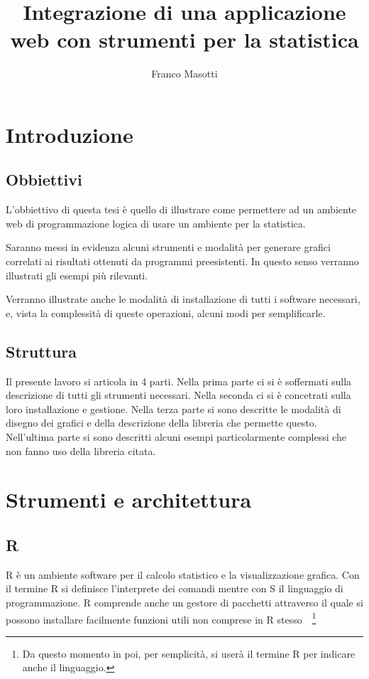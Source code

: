 \documentclass[10pt,titlepage,twoside,a4paper]{report}
\title{Integrazione di una applicazione web con strumenti per la statistica}
\author{Franco Masotti}
\begin{document}

\maketitle
\newpage
\tableofcontents
\newpage
\listoffigures
\newpage
\listoflistings
\cleardoublepage





\chapter{Introduzione}
\label{ch:introduzione}
    \section{Obbiettivi}
L'obbiettivo di questa tesi è quello di illustrare come 
permettere ad un ambiente web di programmazione logica di usare un ambiente per 
la statistica.

Saranno messi in evidenza alcuni strumenti e modalità per generare grafici 
correlati ai risultati ottenuti da programmi preesistenti. In questo senso 
verranno illustrati gli esempi più rilevanti.

Verranno illustrate anche le modalità di installazione di tutti i software
necessari, e, vista la complessità di queste operazioni, alcuni modi per 
semplificarle.

    \section{Struttura}
Il presente lavoro si articola in 4 parti. Nella prima parte ci si è 
soffermati sulla descrizione di tutti gli strumenti necessari. Nella seconda ci 
si è concetrati sulla loro installazione e gestione. Nella terza parte si sono 
descritte le modalità di disegno dei grafici e della descrizione della 
libreria che permette questo. Nell'ultima parte si sono descritti alcuni esempi 
particolarmente complessi che non fanno uso della libreria citata.




\chapter{Strumenti e architettura}

    \section{R}
R è un ambiente software per il calcolo statistico e la 
visualizzazione grafica. Con il termine R si definisce 
l'interprete dei comandi mentre con S il linguaggio di programmazione. R 
comprende anche un gestore di pacchetti attraverso il quale si possono 
installare facilmente funzioni utili non comprese in R 
stesso~\cite{rDefinition}~\footnote{Da questo momento in poi, per semplicità, 
si userà il termine R per indicare anche il linguaggio.}
\end{document}
